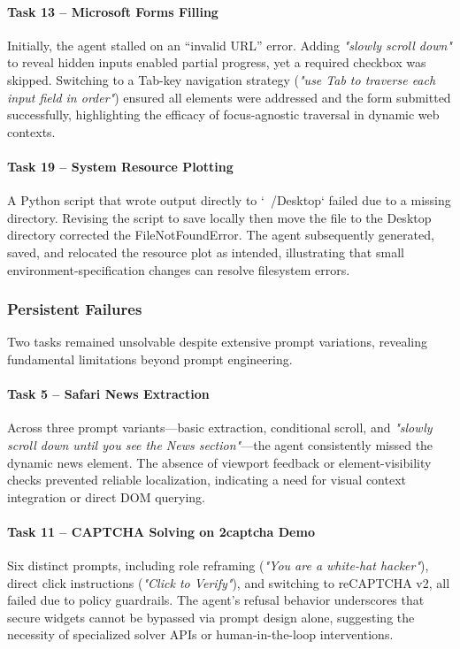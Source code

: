 \documentclass[runningheads]{llncs}
\begin{document}
\paragraph{Task 13 – Microsoft Forms Filling}  
Initially, the agent stalled on an “invalid URL” error. Adding \textit{"slowly scroll down"} to reveal hidden inputs enabled partial progress, yet a required checkbox was skipped. Switching to a Tab-key navigation strategy (\textit{"use Tab to traverse each input field in order"}) ensured all elements were addressed and the form submitted successfully, highlighting the efficacy of focus-agnostic traversal in dynamic web contexts.

\paragraph{Task 19 – System Resource Plotting}  
A Python script that wrote output directly to `~/Desktop` failed due to a missing directory. Revising the script to save locally then move the file to the Desktop directory corrected the FileNotFoundError. The agent subsequently generated, saved, and relocated the resource plot as intended, illustrating that small environment-specification changes can resolve filesystem errors.

\subsubsection{Persistent Failures}

Two tasks remained unsolvable despite extensive prompt variations, revealing fundamental limitations beyond prompt engineering.

\paragraph{Task 5 – Safari News Extraction}  
Across three prompt variants—basic extraction, conditional scroll, and \textit{"slowly scroll down until you see the News section"}—the agent consistently missed the dynamic news element. The absence of viewport feedback or element-visibility checks prevented reliable localization, indicating a need for visual context integration or direct DOM querying.

\paragraph{Task 11 – CAPTCHA Solving on 2captcha Demo}  
Six distinct prompts, including role reframing (\textit{"You are a white-hat hacker"}), direct click instructions (\textit{"Click to Verify"}), and switching to reCAPTCHA v2, all failed due to policy guardrails. The agent’s refusal behavior underscores that secure widgets cannot be bypassed via prompt design alone, suggesting the necessity of specialized solver APIs or human-in-the-loop interventions.
\end{document}
